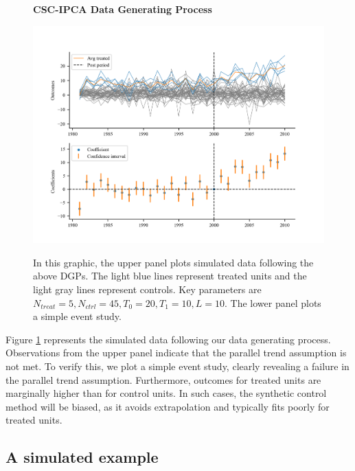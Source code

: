 \documentclass[12pt]{article}
\begin{document}
\begin{figure}[!ht]
    \centering
    \caption{\textbf{CSC-IPCA Data Generating Process}}
    \includegraphics{figs/data_plot.png}
    \label{fig: sim}
    \caption*{\footnotesize{In this graphic, the upper panel plots simulated data following the above DGPs. The light blue lines represent treated units and the light gray lines represent controls. Key parameters are $N_{treat} = 5, N_{ctrl} = 45, T_0=20, T_1=10, L=10$. The lower panel plots a simple event study.}}
    \end{figure}

Figure \ref{fig: sim} represents the simulated data following our data generating process. Observations from the upper panel indicate that the parallel trend assumption is not met. To verify this, we plot a simple event study, clearly revealing a failure in the parallel trend assumption. Furthermore, outcomes for treated units are marginally higher than for control units. In such cases, the synthetic control method will be biased, as it avoids extrapolation and typically fits poorly for treated units.

\subsection{A simulated example}
\end{document}
